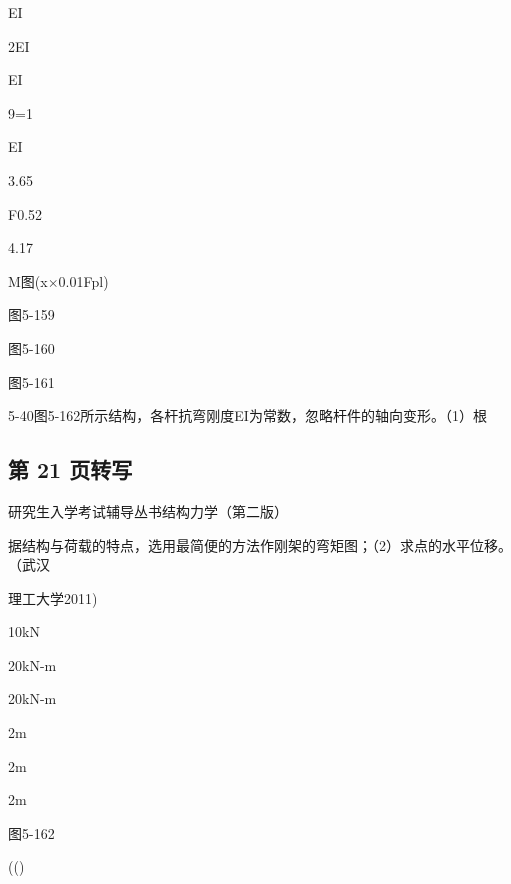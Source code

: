 EI

2EI

EI

9=1

EI

3.65

F0.52

4.17

M图(x$\times$0.01Fpl)

图5-159

图5-160

图5-161

5-40图5-162所示结构，各杆抗弯刚度EI为常数，忽略杆件的轴向变形。（1）根

\subsection*{第 21 页转写}
研究生入学考试辅导丛书结构力学（第二版）

据结构与荷载的特点，选用最简便的方法作刚架的弯矩图；（2）求点的水平位移。（武汉

理工大学2011)

10kN

20kN-m

20kN-m

2m

2m

2m

图5-162

(()

